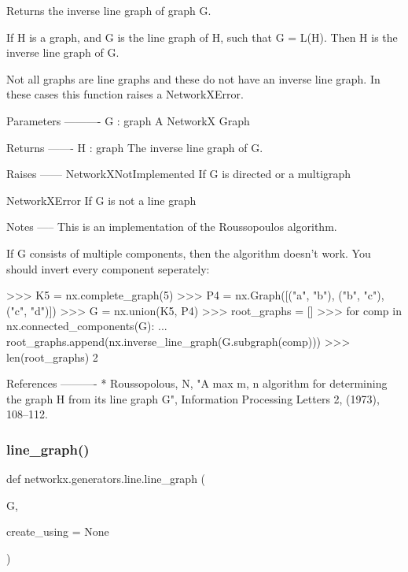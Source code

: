\begin{DoxyVerb}Returns the inverse line graph of graph G.

If H is a graph, and G is the line graph of H, such that G = L(H).
Then H is the inverse line graph of G.

Not all graphs are line graphs and these do not have an inverse line graph.
In these cases this function raises a NetworkXError.

Parameters
----------
G : graph
    A NetworkX Graph

Returns
-------
H : graph
    The inverse line graph of G.

Raises
------
NetworkXNotImplemented
    If G is directed or a multigraph

NetworkXError
    If G is not a line graph

Notes
-----
This is an implementation of the Roussopoulos algorithm.

If G consists of multiple components, then the algorithm doesn't work.
You should invert every component seperately:

>>> K5 = nx.complete_graph(5)
>>> P4 = nx.Graph([("a", "b"), ("b", "c"), ("c", "d")])
>>> G = nx.union(K5, P4)
>>> root_graphs = []
>>> for comp in nx.connected_components(G):
...     root_graphs.append(nx.inverse_line_graph(G.subgraph(comp)))
>>> len(root_graphs)
2

References
----------
* Roussopolous, N, "A max {m, n} algorithm for determining the graph H from
  its line graph G", Information Processing Letters 2, (1973), 108--112.\end{DoxyVerb}
 \mbox{\label{namespacenetworkx_1_1generators_1_1line_a91e386e1b725708aec705908b53d81ca}} 
\subsubsection{\texorpdfstring{line\+\_\+graph()}{line\_graph()}}
{\footnotesize\ttfamily def networkx.\+generators.\+line.\+line\+\_\+graph (\begin{DoxyParamCaption}\item[{}]{G,  }\item[{}]{create\+\_\+using = {\ttfamily None} }\end{DoxyParamCaption})}

